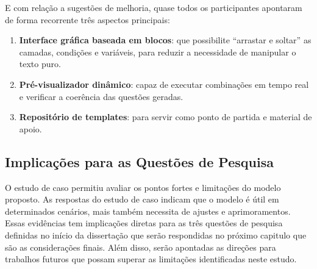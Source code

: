 E com relação a sugestões de melhoria, quase todos os participantes apontaram de forma recorrente três aspectos principais:

\begin{enumerate}
\item \textbf{Interface gráfica baseada em blocos}:  que possibilite “arrastar e soltar” as camadas, condições e variáveis, para reduzir a necessidade de manipular o texto puro.
\item \textbf{Pré-visualizador dinâmico}: capaz de executar combinações em tempo real e verificar a coerência das questões geradas.
\item \textbf{Repositório de templates}: para servir como ponto de partida e material de apoio.
\end{enumerate}




\subsection{Implicações para as Questões de Pesquisa}

O estudo de caso permitiu avaliar os pontos fortes e limitações do modelo proposto. As respostas do estudo de caso indicam que o modelo é útil em determinados cenários, mais também necessita de ajustes e aprimoramentos.
Essas evidências tem implicações diretas para as três questões de pesquisa definidas no início da dissertação que serão respondidas no próximo capitulo que são as considerações finais. Além disso, serão apontadas as direções para trabalhos futuros que possam superar as limitações identificadas neste estudo.
